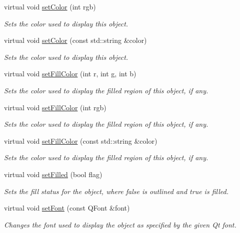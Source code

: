 \begin{DoxyCompactItemize}
virtual void \mbox{\hyperlink{classGObject_ab1f5cc0f5cc6bbbd716a526c61f1081d}{set\+Color}} (int rgb)
\begin{DoxyCompactList}\small\item\em Sets the color used to display this object. \end{DoxyCompactList}\item 
virtual void \mbox{\hyperlink{classGObject_a61374df6c11b52cfbb0815decdbaebc6}{set\+Color}} (const std\+::string \&color)
\begin{DoxyCompactList}\small\item\em Sets the color used to display this object. \end{DoxyCompactList}\item 
virtual void \mbox{\hyperlink{classGObject_ad767a33971159e9493e221cca4c00ae9}{set\+Fill\+Color}} (int r, int g, int b)
\begin{DoxyCompactList}\small\item\em Sets the color used to display the filled region of this object, if any. \end{DoxyCompactList}\item 
virtual void \mbox{\hyperlink{classGObject_aa59d9775a67fa7df2b24a95cd34840a3}{set\+Fill\+Color}} (int rgb)
\begin{DoxyCompactList}\small\item\em Sets the color used to display the filled region of this object, if any. \end{DoxyCompactList}\item 
virtual void \mbox{\hyperlink{classGObject_adbc18b1a930aadd97d7437f9f7265b96}{set\+Fill\+Color}} (const std\+::string \&color)
\begin{DoxyCompactList}\small\item\em Sets the color used to display the filled region of this object, if any. \end{DoxyCompactList}\item 
virtual void \mbox{\hyperlink{classGObject_a9b82b53362282c6bb7d6947068d2e55b}{set\+Filled}} (bool flag)
\begin{DoxyCompactList}\small\item\em Sets the fill status for the object, where {\ttfamily false} is outlined and {\ttfamily true} is filled. \end{DoxyCompactList}\item 
virtual void \mbox{\hyperlink{classGObject_a2592348886ffea646c6534bf88f7c49d}{set\+Font}} (const Q\+Font \&font)
\begin{DoxyCompactList}\small\item\em Changes the font used to display the object as specified by the given Qt font. \end{DoxyCompactList}\item 

\end{DoxyCompactItemize}

